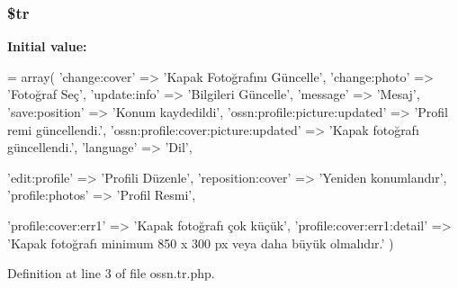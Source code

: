 \subsubsection[{\texorpdfstring{\$tr}{$tr}}]{\setlength{\rightskip}{0pt plus 5cm}\$tr}\hypertarget{components_2_ossn_profile_2locale_2ossn_8tr_8php_a925f466a276b200c71b2567d39b4dba7}{}\label{components_2_ossn_profile_2locale_2ossn_8tr_8php_a925f466a276b200c71b2567d39b4dba7}
{\bfseries Initial value\+:}
\begin{DoxyCode}
= array(
        \textcolor{stringliteral}{'change:cover'} => \textcolor{stringliteral}{'Kapak Fotoğrafını Güncelle'},
        \textcolor{stringliteral}{'change:photo'} => \textcolor{stringliteral}{'Fotoğraf Seç'},
        \textcolor{stringliteral}{'update:info'} => \textcolor{stringliteral}{'Bilgileri Güncelle'},
        \textcolor{stringliteral}{'message'} => \textcolor{stringliteral}{'Mesaj'},
        \textcolor{stringliteral}{'save:position'} => \textcolor{stringliteral}{'Konum kaydedildi'},
        \textcolor{stringliteral}{'ossn:profile:picture:updated'} => \textcolor{stringliteral}{'Profil remi güncellendi.'},
        \textcolor{stringliteral}{'ossn:profile:cover:picture:updated'} => \textcolor{stringliteral}{'Kapak fotoğrafı güncellendi.'},
        \textcolor{stringliteral}{'language'} => \textcolor{stringliteral}{'Dil'},
        
        \textcolor{stringliteral}{'edit:profile'} => \textcolor{stringliteral}{'Profili Düzenle'},
        \textcolor{stringliteral}{'reposition:cover'} => \textcolor{stringliteral}{'Yeniden konumlandır'},
        \textcolor{stringliteral}{'profile:photos'} => \textcolor{stringliteral}{'Profil Resmi'},
        
        \textcolor{stringliteral}{'profile:cover:err1'} => \textcolor{stringliteral}{'Kapak fotoğrafı çok küçük'},
        \textcolor{stringliteral}{'profile:cover:err1:detail'} => \textcolor{stringliteral}{'Kapak fotoğrafı minimum 850 x 300 px veya daha büyük olmalıdır.'}
)
\end{DoxyCode}


Definition at line 3 of file ossn.\+tr.\+php.

